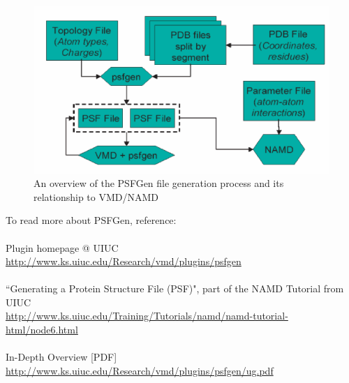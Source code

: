 \begin{figure}[H]
\centering
\includegraphics[scale=0.6]{images/psfgen}
\caption{An overview of the PSFGen file generation process and its relationship to VMD/NAMD}
\end{figure}
To read more about PSFGen, reference:\\\\
Plugin homepage @ UIUC\\
\url{http://www.ks.uiuc.edu/Research/vmd/plugins/psfgen}\\\\
``Generating a Protein Structure File (PSF)", part of the NAMD Tutorial from UIUC\\
\url{http://www.ks.uiuc.edu/Training/Tutorials/namd/namd-tutorial-html/node6.html}\\\\
In-Depth Overview [PDF]\\
\url{http://www.ks.uiuc.edu/Research/vmd/plugins/psfgen/ug.pdf}\\\\

